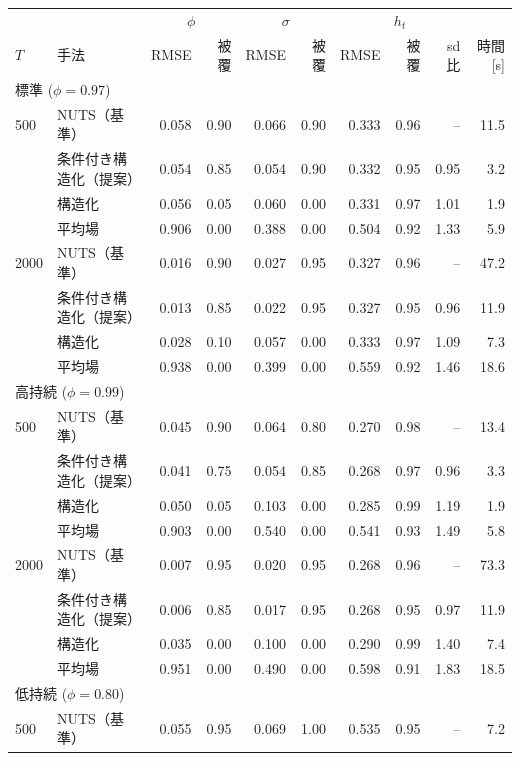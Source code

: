 \begin{tabular}{llrrrrrrrr}
\toprule
 & & \multicolumn{2}{c}{$\phi$} & \multicolumn{2}{c}{$\sigma$} & \multicolumn{3}{c}{$h_t$} & \\
$T$ & 手法 & RMSE & 被覆 & RMSE & 被覆 & RMSE & 被覆 & sd比 & 時間[s] \\
\midrule
\multicolumn{10}{l}{標準 ($\phi=0.97$)} \\
500 & NUTS（基準） & 0.058 & 0.90 & 0.066 & 0.90 & 0.333 & 0.96 & -- & 11.5 \\
 & 条件付き構造化（提案） & 0.054 & 0.85 & 0.054 & 0.90 & 0.332 & 0.95 & 0.95 & 3.2 \\
 & 構造化 & 0.056 & 0.05 & 0.060 & 0.00 & 0.331 & 0.97 & 1.01 & 1.9 \\
 & 平均場 & 0.906 & 0.00 & 0.388 & 0.00 & 0.504 & 0.92 & 1.33 & 5.9 \\
2000 & NUTS（基準） & 0.016 & 0.90 & 0.027 & 0.95 & 0.327 & 0.96 & -- & 47.2 \\
 & 条件付き構造化（提案） & 0.013 & 0.85 & 0.022 & 0.95 & 0.327 & 0.95 & 0.96 & 11.9 \\
 & 構造化 & 0.028 & 0.10 & 0.057 & 0.00 & 0.333 & 0.97 & 1.09 & 7.3 \\
 & 平均場 & 0.938 & 0.00 & 0.399 & 0.00 & 0.559 & 0.92 & 1.46 & 18.6 \\
\midrule
\multicolumn{10}{l}{高持続 ($\phi=0.99$)} \\
500 & NUTS（基準） & 0.045 & 0.90 & 0.064 & 0.80 & 0.270 & 0.98 & -- & 13.4 \\
 & 条件付き構造化（提案） & 0.041 & 0.75 & 0.054 & 0.85 & 0.268 & 0.97 & 0.96 & 3.3 \\
 & 構造化 & 0.050 & 0.05 & 0.103 & 0.00 & 0.285 & 0.99 & 1.19 & 1.9 \\
 & 平均場 & 0.903 & 0.00 & 0.540 & 0.00 & 0.541 & 0.93 & 1.49 & 5.8 \\
2000 & NUTS（基準） & 0.007 & 0.95 & 0.020 & 0.95 & 0.268 & 0.96 & -- & 73.3 \\
 & 条件付き構造化（提案） & 0.006 & 0.85 & 0.017 & 0.95 & 0.268 & 0.95 & 0.97 & 11.9 \\
 & 構造化 & 0.035 & 0.00 & 0.100 & 0.00 & 0.290 & 0.99 & 1.40 & 7.4 \\
 & 平均場 & 0.951 & 0.00 & 0.490 & 0.00 & 0.598 & 0.91 & 1.83 & 18.5 \\
\midrule
\multicolumn{10}{l}{低持続 ($\phi=0.80$)} \\
500 & NUTS（基準） & 0.055 & 0.95 & 0.069 & 1.00 & 0.535 & 0.95 & -- & 7.2 \\

\end{tabular}
